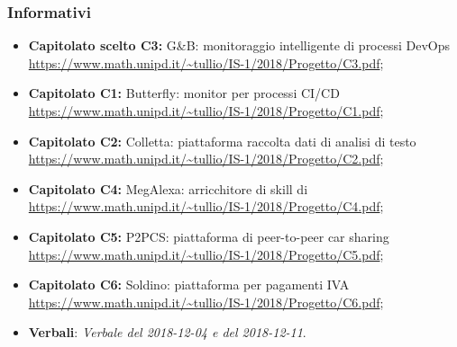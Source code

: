 		\subsubsection{Informativi}
		\begin{itemize}
			\item \textbf{Capitolato scelto C3:} G\&B: monitoraggio intelligente di processi DevOps \\ 
			\url{https://www.math.unipd.it/~tullio/IS-1/2018/Progetto/C3.pdf};
 			\item \textbf{Capitolato  C1:} Butterfly: monitor per processi CI/CD \\ \url{https://www.math.unipd.it/~tullio/IS-1/2018/Progetto/C1.pdf};
 			\item \textbf{Capitolato C2:} Colletta: piattaforma raccolta dati di analisi di testo \\ 
 			\url{https://www.math.unipd.it/~tullio/IS-1/2018/Progetto/C2.pdf};
 			\item \textbf{Capitolato C4:} MegAlexa: arricchitore di skill di  \\ \url{https://www.math.unipd.it/~tullio/IS-1/2018/Progetto/C4.pdf};
 			\item \textbf{Capitolato C5:} P2PCS: piattaforma di peer-to-peer car sharing \\ \url{https://www.math.unipd.it/~tullio/IS-1/2018/Progetto/C5.pdf};
 			\item \textbf{Capitolato C6:} Soldino: piattaforma  per pagamenti IVA \\ \url{https://www.math.unipd.it/~tullio/IS-1/2018/Progetto/C6.pdf};
 			\item \textbf{Verbali}: \emph{Verbale del 2018-12-04 e del 2018-12-11}.
 			
		\end{itemize}
	\pagebreak
		


